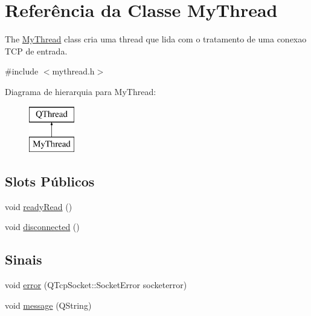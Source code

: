 \hypertarget{class_my_thread}{}\section{Referência da Classe My\+Thread}
\label{class_my_thread}


The \mbox{\hyperlink{class_my_thread}{My\+Thread}} class cria uma thread que lida com o tratamento de uma conexao T\+CP de entrada.  




{\ttfamily \#include $<$mythread.\+h$>$}

Diagrama de hierarquia para My\+Thread\+:\begin{figure}[H]
\begin{center}
\leavevmode
\includegraphics[height=2.000000cm]{class_my_thread}
\end{center}
\end{figure}
\subsection*{Slots Públicos}
\begin{DoxyCompactItemize}
\item 
void \mbox{\hyperlink{class_my_thread_a277618fdd448b927f2e250c2076fc176}{ready\+Read}} ()
\item 
void \mbox{\hyperlink{class_my_thread_a447710039787ae20134a9b572487840f}{disconnected}} ()
\end{DoxyCompactItemize}
\subsection*{Sinais}
\begin{DoxyCompactItemize}
\item 
void \mbox{\hyperlink{class_my_thread_aebf11d93838f22c9547d0c6aa97002be}{error}} (Q\+Tcp\+Socket\+::\+Socket\+Error socketerror)
\item 
void \mbox{\hyperlink{class_my_thread_ae49528d4ec1b2208240f707f5aa74adf}{message}} (Q\+String)
\end{DoxyCompactItemize}
